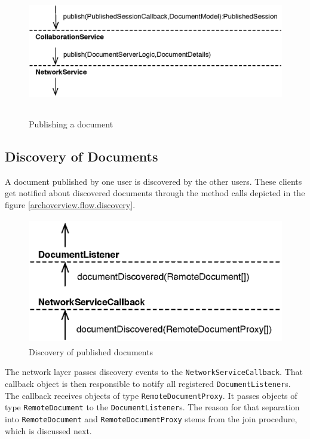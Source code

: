 \begin{figure}[H]
 \centering
 \includegraphics[width=15.70cm,height=5.72cm]{../images/finalreport/architecture_flows/publish.eps}
 \caption{Publishing a document}
 \label{fig:archoverview.flow.publish}
\end{figure}


\subsection{Discovery of Documents}
\label{sect:archoverview.flow.discovery}
A document published by one user is discovered by the other users. These
clients get notified about discovered documents through the method calls
depicted in the figure \ref{archoverview.flow.discovery}.

\begin{figure}[H]
 \centering
 \includegraphics[width=11.84cm,height=5.50cm]{../images/finalreport/architecture_flows/discovery.eps}
 \caption{Discovery of published documents}
 \label{fig:archoverview.flow.discovery}
\end{figure}

The network layer passes discovery events to the 
\texttt{NetworkServiceCallback}. That callback object is then responsible
to notify all registered \texttt{DocumentListener}s. The callback receives
objects of type \texttt{RemoteDocumentProxy}. It passes objects of type
\texttt{RemoteDocument} to the \texttt{DocumentListener}s. The reason
for that separation into \texttt{RemoteDocument} and 
\texttt{RemoteDocumentProxy} stems from the join procedure, which is
discussed next.


